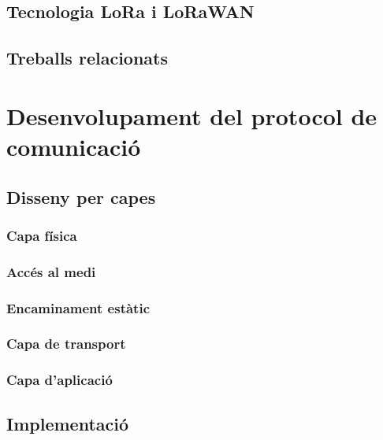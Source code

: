 \documentclass{tfgitic}[2024/07/01]
\begin{document}
\section{Tecnologia LoRa i LoRaWAN}
\section{Treballs relacionats}

\chapter{Desenvolupament del protocol de comunicació}
\section{Disseny per capes}
\subsection{Capa física}
\subsection{Accés al medi}
\subsection{Encaminament estàtic}
\subsection{Capa de transport}
\subsection{Capa d’aplicació}
\section{Implementació}
\end{document}
